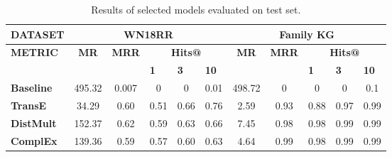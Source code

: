 \begin{table}[htbp]
\centering
\begin{tabular}{|l||ccccc||ccccc|}
\hline
{\textbf{DATASET}}                 & \multicolumn{5}{c||}{\textbf{WN18RR}}                                                                                                                                               & \multicolumn{5}{c|}{\textbf{Family KG}}                                                                                                                            \\ \hline
\multirow{2}{*}{{\textbf{METRIC}}} & \multicolumn{1}{c|}{\multirow{2}{*}{\textbf{MR}}} & \multicolumn{1}{c|}{\multirow{2}{*}{\textbf{MRR}}} & \multicolumn{3}{c||}{\textbf{Hits@}}                                       & \multicolumn{1}{c|}{\multirow{2}{*}{\textbf{MR}}} & \multicolumn{1}{c|}{\multirow{2}{*}{\textbf{MRR}}} & \multicolumn{3}{c|}{\textbf{Hits@}}                                       \\ \cline{4-6} \cline{9-11} 
                                       & \multicolumn{1}{c|}{}                             & \multicolumn{1}{c|}{}                              & \multicolumn{1}{l|}{\textbf{1}} & \multicolumn{1}{l|}{\textbf{3}} & \multicolumn{1}{l||}{\textbf{10}} & \multicolumn{1}{c|}{}                             & \multicolumn{1}{c|}{}                              & \multicolumn{1}{l|}{\textbf{1}} & \multicolumn{1}{l|}{\textbf{3}} & \multicolumn{1}{l|}{\textbf{10}} \\ \hline
\textbf{Baseline}       & 495.32     & 0.007      & 0     & 0       & 0.01        & 498.72       & 0     & 0       & 0       & 0.1      \\ 
\textbf{TransE}  & 34.29  & 0.60       & 0.51                     & 0.66    & 0.76 & 2.59     & 0.93  &0.88  & 0.97   & 0.99   \\ 
\textbf{DistMult}      & 152.37  & 0.62    & 0.59   & 0.63      & 0.66   & 7.45    & 0.98     & 0.98    & 0.99   & 0.99    \\ 
\textbf{ComplEx}        & 139.36    & 0.59      & 0.57      & 0.60      & 0.63      & 4.64     & 0.99     & 0.98     & 0.99      & 0.99  \\ \hline
\end{tabular}
\caption[Test results of selected model.]{Results of selected models evaluated on test set.}
\end{table}


